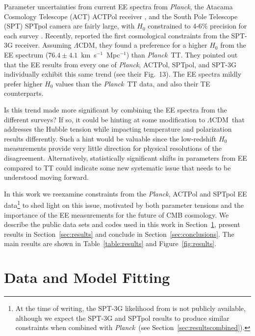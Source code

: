 \documentclass[twocolumn]{aastex63}
\newcommand{\planck}{\textsl{Planck}}
\newcommand{\lcdm}{\ensuremath{\Lambda\mathrm{CDM}}}
\begin{document}
Parameter uncertainties from current EE spectra from \planck, the Atacama Cosmology Telescope (ACT) ACTPol receiver \citep{thornton/etal:2016}, and the South Pole Telescope (SPT) SPTpol camera \citep{austermann/etal:2012} are fairly large, with $H_0$ constrained to 4-6\% precision for each survey \citep{planck2016-l06,henning/etal:2018,aiola/etal:2020}. Recently, \cite{dutcher/etal:prep} reported the first cosmological constraints from the SPT-3G receiver. Assuming \lcdm, they found a preference for a higher $H_0$ from the EE spectrum ($76.4\pm4.1$~km~s$^{-1}$~Mpc$^{-1}$) than \planck\ TT. They pointed out that the EE results from every one of \planck, ACTPol, SPTpol, and SPT-3G individually exhibit this same trend (see their Fig.~13). The EE spectra mildly prefer higher $H_0$ values than the \planck\ TT data, and also their TE counterparts.

Is this trend made more significant by combining the EE spectra from the different surveys? If so, it could be hinting at some modification to \lcdm\ that addresses the Hubble tension while impacting temperature and polarization results differently. Such a hint would be valuable since the low-redshift $H_0$ measurements provide very little direction for physical resolutions of the disagreement. Alternatively, statistically significant shifts in parameters from EE compared to TT could indicate some new systematic issue that needs to be understood moving forward.

In this work we reexamine constraints from the \planck, ACTPol and SPTpol EE data\footnote{At the time of writing, the SPT-3G likelihood from \cite{dutcher/etal:prep} is not publicly available, although we expect the SPT-3G  and SPTpol results to produce similar constraints when combined with \planck\ (see Section~\ref{sec:resultscombined}).} to shed light on this issue, motivated by both parameter tensions and the importance of the EE measurements for the future of CMB cosmology. We describe the public data sets and codes used in this work in Section~\ref{sec:datamodel}, present results in Section~\ref{sec:results} and conclude in Section~\ref{sec:conclusions}. The main results are shown in Table~\ref{table:results} and Figure~\ref{fig:results}.

\section{Data and Model Fitting}
\label{sec:datamodel}
\end{document}
